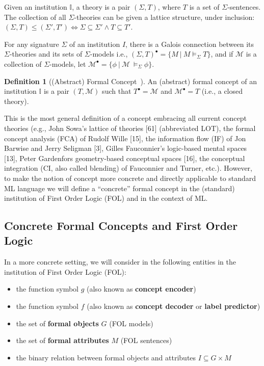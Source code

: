 \documentclass[withindex,glossary]{cam-thesis}
\theoremstyle{plain}
\theoremstyle{definition}
\newtheorem{definition}[theorem]{Definition}
\theoremstyle{remark}
\begin{document}
Given an institution $\mathbb{I}$, a theory is a pair $(\Sigma,T)$, where $T$ is a set of $\Sigma$-sentences. The collection of all $\Sigma$-theories can be given a lattice structure, under inclusion: $(\Sigma,T) \leq (\Sigma',T') \iff \Sigma \subseteq \Sigma' \wedge T \subseteq T'$.

For any signature $\Sigma$ of an institution $I$, there is a Galois connection between its $\Sigma$-theories and its sets of $\Sigma$-models i.e., $(\Sigma,T)^\bullet = \{M \ | \ M \models_\Sigma T\}$, and if $\mathcal{M}$ is a collection of $\Sigma$-models, let $\mathcal{M}^\bullet = \{\phi \ | \ \mathcal{M} \ \models_\Sigma \phi\}$.

\begin{definition}[(Abstract) Formal Concept~\citep{goguen2005concept}]
An (abstract) formal concept of an institution $\mathbb{I}$ is a pair $(T,\mathcal{M})$ such that $T^\bullet = \mathcal{M}$ and $\mathcal{M}^\bullet = T$ (i.e., a closed theory).
\end{definition}

This is the most general definition of a concept embracing all current concept theories (e.g., John Sowa’s lattice of theories [61] (abbreviated LOT), the formal concept analysis (FCA) of Rudolf Wille [15], the information flow (IF) of Jon Barwise and Jerry Seligman [3], Gilles Fauconnier’s logic-based mental spaces [13], Peter Gardenfors geometry-based conceptual spaces [16], the conceptual integration (CI, also called blending) of Fauconnier and Turner, etc.). However, to make the notion of concept more concrete and directly applicable to standard ML language we will define a ``concrete'' formal concept in the (standard) institution of First Order Logic (FOL) and in the context of ML.


\subsection{Concrete Formal Concepts and First Order Logic}

In a more concrete setting, we will consider in the following entities in the institution of First Order Logic (FOL):
\begin{itemize}
    \item the function symbol $g$ (also known as \textbf{concept encoder})
    \item the function symbol $f$ (also known as \textbf{concept decoder} or \textbf{label predictor})
    \item the set of \textbf{formal objects} $G$ (FOL models)
    \item the set of \textbf{formal attributes} $M$ (FOL sentences)
    \item the binary relation between formal objects and attributes $I \subseteq G \times M$
\end{itemize}
\end{document}
